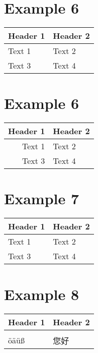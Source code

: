 \section{Example 6}\label{example-6}

\begin{longtable}[c]{@{}ll@{}}
\toprule
\textbf{Header 1} & Header 2\tabularnewline
\midrule
\endhead
Text 1\autocite{source} & Text 2\tabularnewline
Text 3 & Text 4\tabularnewline
\bottomrule
\end{longtable}

\section{Example 6}\label{example-6-1}

\begin{longtable}[c]{@{}rl@{}}
\toprule
Header 1 & Header 2\tabularnewline
\midrule
\endhead
Text 1 & Text 2\tabularnewline
Text 3 & Text 4\tabularnewline
\bottomrule
\end{longtable}

\section{Example 7}\label{example-7}

\begin{longtable}[c]{@{}ll@{}}
\toprule
\begin{minipage}[b]{0.38\columnwidth}\raggedright\strut
Header 1
\strut\end{minipage} &
\begin{minipage}[b]{0.56\columnwidth}\raggedright\strut
Header 2
\strut\end{minipage}\tabularnewline
\midrule
\endhead
\begin{minipage}[t]{0.38\columnwidth}\raggedright\strut
Text 1
\strut\end{minipage} &
\begin{minipage}[t]{0.56\columnwidth}\raggedright\strut
Text 2
\strut\end{minipage}\tabularnewline
\begin{minipage}[t]{0.38\columnwidth}\raggedright\strut
Text 3
\strut\end{minipage} &
\begin{minipage}[t]{0.56\columnwidth}\raggedright\strut
Text 4
\strut\end{minipage}\tabularnewline
\bottomrule
\end{longtable}

\section{Example 8}\label{example-8}

\begin{longtable}[c]{@{}ll@{}}
\toprule
Header 1 & Header 2\tabularnewline
\midrule
\endhead
&\tabularnewline
öäüß & 您好\tabularnewline
\bottomrule
\end{longtable}
